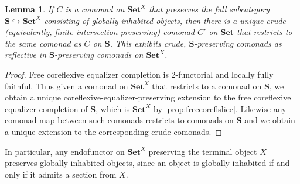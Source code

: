 \documentclass[11pt, oneside, article]{memoir}
\theoremstyle{plain}
\newtheorem{lemma}[theorem]{Lemma}
\theoremstyle{definition}
\theoremstyle{remark}
\newcommand{\namedcat}[1]{\mathbf{#1}}
\newcommand{\cat}[1]{\mathbf{#1}}
\newcommand{\Set}{\namedcat{Set}}
\newcommand{\cmnd}[1]{{#1}}
\newcommand{\xX}{X}
\newcommand{\cC}{\cmnd{C}}
\newcommand{\bS}{\cat{S}}
\newcommand{\sS}{\namedcat{S}}
\begin{document}

\begin{lemma}\label{lem:crepreflection}
  If $\cC$ is a comonad on $\Set^\xX$ that preserves the full
  subcategory $\sS \hookrightarrow \Set^\xX$ consisting of globally inhabited objects,
  then there is a unique crude (equivalently,
  finite-intersection-preserving) comonad $\cC'$ on $\Set$ that
  restricts to the same comonad as $\cC$ on $\sS$.
  This exhibits crude, $\sS$-preserving comonads as reflective in
  $\sS$-preserving comonads on $\Set^\xX$.
\end{lemma}
\begin{proof}
  Free coreflexive equalizer completion is 2-functorial and locally
  fully faithful. Thus given a comonad on $\Set^\xX$ that restricts to
  a comonad on $\sS$, we obtain a unique
  coreflexive-equalizer-preserving extension to the free coreflexive
  equalizer completion of $\sS$, which is $\Set^\xX$ by
  \cref{prop:freecoreflslice}. Likewise any comonad map between such
  comonads restricts to comonads on $\sS$ and we obtain a unique
  extension to the corresponding crude comonads.
\end{proof}

In particular, any endofunctor on $\Set^\xX$ preserving the terminal
object $\xX$ preserves globally inhabited objects, since
an object is globally inhabited if and only if it admits a section from $\xX$.
\end{document}
